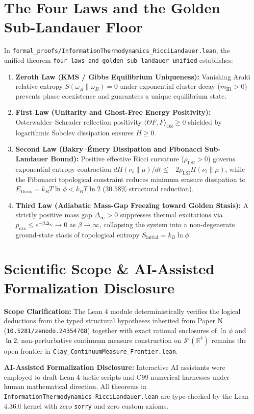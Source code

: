 \documentclass[11pt,a4paper]{article}
\begin{document}
\section{The Four Laws and the Golden Sub-Landauer Floor}
In \texttt{formal\_proofs/InformationThermodynamics\_RicciLandauer.lean}, the unified theorem \texttt{four\_laws\_and\_golden\_sub\_landauer\_unified} establishes:
\begin{enumerate}
  \item \textbf{Zeroth Law (KMS / Gibbs Equilibrium Uniqueness):} Vanishing Araki relative entropy $S(\omega_A \| \omega_B) = 0$ under exponential cluster decay ($m_{\mathrm{IR}} > 0$) prevents phase coexistence and guarantees a unique equilibrium state.
  \item \textbf{First Law (Unitarity and Ghost-Free Energy Positivity):} Osterwalder--Schrader reflection positivity $\langle \Theta F, F \rangle_{\mathrm{OS}} \ge 0$ shielded by logarithmic Sobolev dissipation ensures $H \ge 0$.
  \item \textbf{Second Law (Bakry--\'Emery Dissipation and Fibonacci Sub-Landauer Bound):} Positive effective Ricci curvature ($\rho_{\mathrm{LSI}} > 0$) governs exponential entropy contraction $dH(\nu_t \| \mu)/dt \le -2\rho_{\mathrm{LSI}} H(\nu_t \| \mu)$, while the Fibonacci topological constraint reduces minimum erasure dissipation to $E_{\mathrm{Oasis}} = k_B T \ln \phi < k_B T \ln 2$ ($30.58\%$ structural reduction).
  \item \textbf{Third Law (Adiabatic Mass-Gap Freezing toward Golden Stasis):} A strictly positive mass gap $\Delta_\infty > 0$ suppresses thermal excitations via $p_{\mathrm{exc}} \le e^{-\beta \Delta_\infty} \to 0$ as $\beta \to \infty$, collapsing the system into a non-degenerate ground-state stasis of topological entropy $S_{\mathrm{initial}} = k_B \ln \phi$.
\end{enumerate}

\section{Scientific Scope \& AI-Assisted Formalization Disclosure}
\textbf{Scope Clarification:} The Lean 4 module deterministically verifies the logical deductions from the typed structural hypotheses inherited from Paper N (\texttt{10.5281/zenodo.24354708}) together with exact rational enclosures of $\ln\phi$ and $\ln 2$; non-perturbative continuum measure construction on $\mathcal{S}'(\mathbb{R}^4)$ remains the open frontier in \texttt{Clay\_ContinuumMeasure\_Frontier.lean}.

\textbf{AI-Assisted Formalization Disclosure:} Interactive AI assistants were employed to draft Lean 4 tactic scripts and C99 numerical harnesses under human mathematical direction. All theorems in \texttt{InformationThermodynamics\_RicciLandauer.lean} are type-checked by the Lean 4.36.0 kernel with zero \texttt{sorry} and zero custom axioms.
\end{document}
